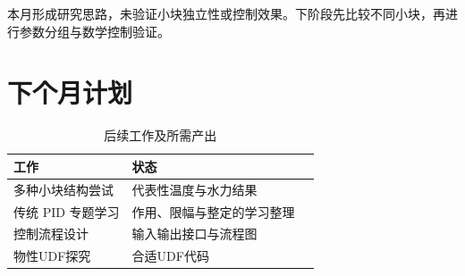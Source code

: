 \documentclass[stage1,fontset=fandol]{ydzjreport}
\begin{document}
本月形成研究思路，未验证小块独立性或控制效果。下阶段先比较不同小块，再进行参数分组与数学控制验证。

\section{下个月计划}

\begin{table}[H]\centering
\caption{后续工作及所需产出}\label{tab:plan}
\begin{tabularx}{\textwidth}{@{}Y Y Y@{}}
\toprule
{} 工作 & 状态  \\
\midrule
多种小块结构尝试 & 代表性温度与水力结果  \\
传统 PID 专题学习 & 作用、限幅与整定的学习整理  \\
控制流程设计 & 输入输出接口与流程图  \\
物性UDF探究 & 合适UDF代码  \\
\bottomrule\end{tabularx}\end{table}
\end{document}
